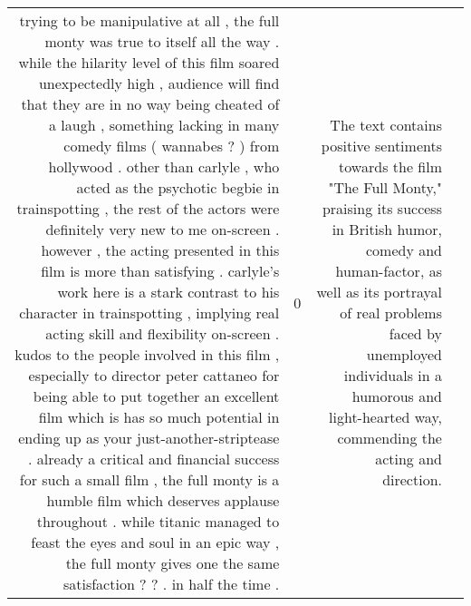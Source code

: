 \begin{tabular}{r{1cm} p{0.4in} r{1cm} p{0.4in}}
trying to be manipulative at all , the full monty was true to itself all the way .  while the hilarity level of this film soared unexpectedly high , audience will find that they are in no way being cheated of a laugh , something lacking in many comedy films ( wannabes ? ) from hollywood .  other than carlyle , who acted as the psychotic begbie in trainspotting , the rest of the actors were definitely very new to me on-screen .  however , the acting presented in this film is more than satisfying .  carlyle's work here is a stark contrast to his character in trainspotting , implying real acting skill and flexibility on-screen .  kudos to the people involved in this film , especially to director peter cattaneo for being able to put together an excellent film which is has so much potential in ending up as your just-another-striptease .  already a critical and financial success for such a small film , the full monty is a humble film which deserves applause throughout .  while titanic managed to feast the eyes and soul in an epic way , the full monty gives one the same satisfaction ? ? . in  half the time .   & 0 & The text contains positive sentiments towards the film "The Full Monty," praising its success in British humor, comedy and human-factor, as well as its portrayal of real problems faced by unemployed individuals in a humorous and light-hearted way, commending the acting and direction. \\

\end{tabular}
